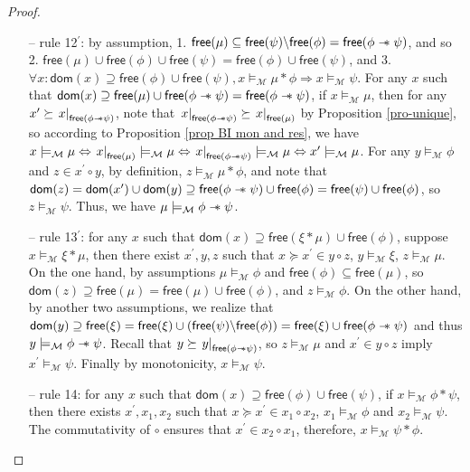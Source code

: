 \documentclass[conference,compsoc, 10pt]{IEEEtran}
\newcommand {\cM } {{\mathcal{M}}}
\newcommand {\Ldom }[1] {{\mathsf{dom}\!\left(#1\right)}}
\newcommand {\Lfree }[1] {{\mathsf{free}{\left(#1\right)}}}
\newcommand {\rt }[2] {{\left.{#1}\right|_{#2}}}
\newcommand {\sepimp} {\mathrel{-\mkern-6mu*}}
\begin{document}
\begin{appendices}
\begin{proof}
\begin{itemize}
				\item[--] rule 12$^\prime$: by assumption, 1. $\Lfree{\mu}\subseteq\Lfree{\psi}\backslash\Lfree{\phi} = \Lfree{\phi\sepimp\psi}$, and so 2. $\Lfree{\mu}\cup\Lfree{\phi}\cup\Lfree{\psi} = \Lfree{\phi}\cup\Lfree{\psi}$, and 3. $\forall x: \Ldom{x}\supseteq\Lfree{\phi}\cup\Lfree{\psi}, x\models_\cM \mu\ast\phi\Rightarrow x\models_\cM\psi$. For any $x$ such that $\Ldom{x}\supseteq\Lfree{\mu}\cup\Lfree{\phi\sepimp\psi} = \Lfree{\phi\sepimp\psi}$, if $x\models_\cM\mu$, then for any $x^\prime\succeq \rt{x}{\Lfree{\phi\sepimp\psi}}$, note that $\rt{x}{\Lfree{\phi\sepimp\psi}}\succeq \rt{x}{\Lfree{\mu}}$ by Proposition \ref{pro-unique}, so according to Proposition \ref{prop BI mon and res}, we have $x\models_\cM\mu\Leftrightarrow \rt{x}{\Lfree{\mu}}\models_\cM\mu\Leftrightarrow \rt{x}{\Lfree{\phi\sepimp\psi}}\models_\cM\mu\Leftrightarrow x^\prime\models_\cM\mu$. For any $y\models_\cM\phi$ and $z\in x^\prime\circ y$, by definition, $z\models_\cM\mu\ast\phi$, and note that $\Ldom{z} = \Ldom{x^\prime}\cup\Ldom{y}\supseteq \Lfree{\phi\sepimp\psi}\cup\Lfree{\phi} = \Lfree{\psi}\cup\Lfree{\phi}$, so $z\models_\cM\psi$. Thus, we have $\mu\models_\cM \phi\sepimp\psi$.
				\item[--] rule 13$^\prime$: for any $x$ such that $\Ldom{x}\supseteq \Lfree{\xi\ast\mu}\cup\Lfree{\phi}$, suppose $x\models_\cM\xi\ast\mu$, then there exist $x^\prime,y,z$ such that $x\succeq x^\prime\in y\circ z$, $y\models_\cM\xi$, $z\models_\cM\mu$. On the one hand, by assumptions $\mu\models_\cM\phi$ and $\Lfree{\phi}\subseteq\Lfree{\mu}$, so $\Ldom{z}\supseteq\Lfree{\mu} = \Lfree{\mu}\cup\Lfree{\phi}$, and $z\models_\cM\phi$. On the other hand, by another two assumptions, we realize that $\Ldom{y}\supseteq \Lfree{\xi} = \Lfree{\xi}\cup(\Lfree{\psi}\backslash\Lfree{\phi}) = \Lfree{\xi}\cup\Lfree{\phi\sepimp\psi}$ and thus $y\models_\cM\phi\sepimp\psi$. Recall that $y\succeq \rt{y}{\Lfree{\phi\sepimp\psi}}$, so $z\models_\cM\mu$ and $x^\prime\in y\circ z$ imply $x^\prime\models_\cM\psi$. Finally by monotonicity, $x\models_\cM \psi$.
				\item[--] rule 14: for any $x$ such that $\Ldom{x}\supseteq\Lfree{\phi}\cup\Lfree{\psi}$, if $x\models_\cM\phi\ast\psi$, then there exists $x^\prime,x_1,x_2$ such that $x\succeq x^\prime \in x_1\circ x_2$, $x_1\models_\cM \phi$ and $x_2\models_\cM \psi$. The commutativity of $\circ$ ensures that $x^\prime \in x_2\circ x_1$, therefore, $x\models_\cM\psi\ast\phi$.

\end{itemize}
\end{proof}
\end{appendices}
\end{document}
